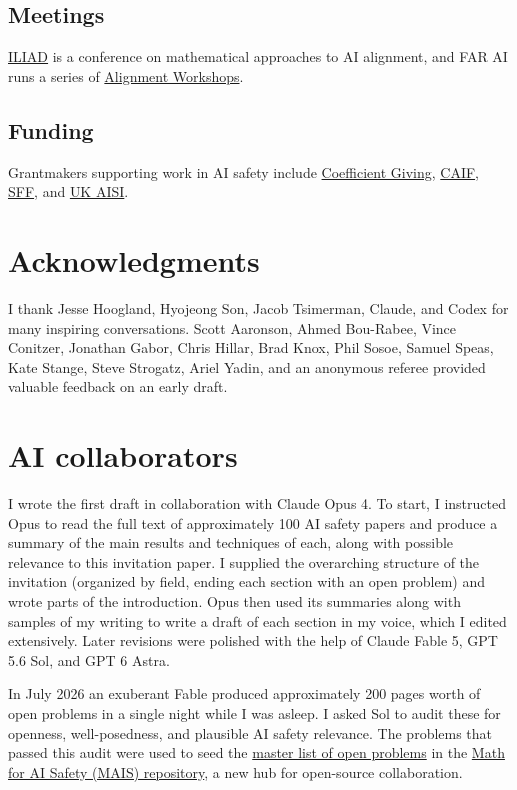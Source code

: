 \subsection*{Meetings}
\href{https://www.iliadconference.com}{ILIAD} is a conference on mathematical approaches to AI alignment, and FAR AI runs a series of \href{https://www.far.ai/events}{Alignment Workshops}.

\subsection*{Funding}
Grantmakers supporting work in AI safety include \href{https://coefficientgiving.org/funds/navigating-transformative-ai/}{Coefficient Giving}, \href{https://www.cooperativeai.com/}{CAIF}, \href{https://survivalandflourishing.fund/}{SFF}, and \href{https://alignmentproject.aisi.gov.uk/}{UK AISI}.

\section*{Acknowledgments}

I thank Jesse Hoogland, Hyojeong Son, Jacob Tsimerman, Claude, and Codex for many inspiring conversations. Scott Aaronson, Ahmed Bou-Rabee, Vince Conitzer, Jonathan Gabor, Chris Hillar, Brad Knox, Phil Sosoe, Samuel Speas, Kate Stange, Steve Strogatz, Ariel Yadin, and an anonymous referee provided valuable feedback on an early draft.

\section*{AI collaborators}
\label{sec:ai-collaborators}

I wrote the first draft in collaboration with Claude Opus 4. To start, I instructed Opus to read the full text of approximately 100 AI safety papers and produce a summary of the main results and techniques of each, along with possible relevance to this invitation paper. I supplied the overarching structure of the invitation (organized by field, ending each section with an open problem) and wrote parts of the introduction. Opus then used its summaries along with samples of my writing to write a draft of each section in my voice, which I edited extensively. Later revisions were polished with the help of Claude Fable 5, GPT 5.6 Sol, and GPT 6 Astra.

In July 2026 an exuberant Fable produced approximately 200 pages worth of open problems in a single night while I was asleep. I asked Sol to audit these for openness, well-posedness, and plausible AI safety relevance. The problems that passed this audit were used to seed the \href{https://github.com/lionellevine/MAIS/blob/main/open-problems/README.md}{master list of open problems} in the \href{https://github.com/lionellevine/MAIS}{Math for AI Safety (MAIS) repository}, a new hub for open-source collaboration. 

